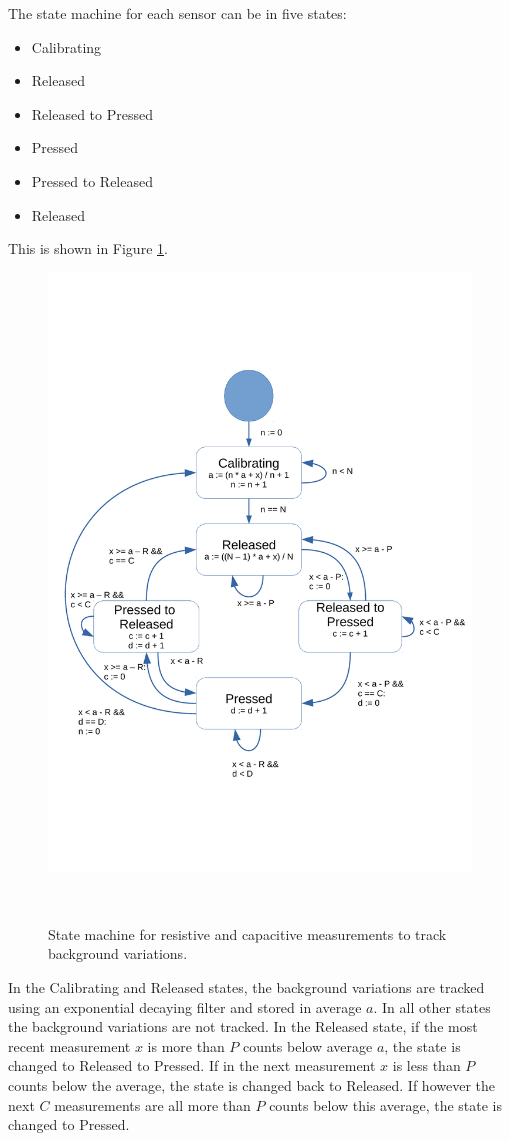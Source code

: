 \documentclass{sigchi-ext}
\begin{document}
The state machine for each sensor can be in five states:
\begin{itemize}
\item Calibrating
\item Released
\item Released to Pressed
\item Pressed
\item Pressed to Released
\item Released
\end{itemize}
This is shown in Figure \ref{fig:state_machine}.

\begin{figure}[!htbp]
\centering
  \includegraphics[width=0.9\columnwidth]{figures/state_machine}
  \caption{State machine for resistive and capacitive measurements to track
background variations.}~\label{fig:state_machine}
\end{figure}

In the Calibrating and Released states, the background variations are tracked
using an exponential decaying filter and stored in average $a$. In all other
states the background variations are not tracked. In the Released state, if the
most recent measurement $x$ is more than $P$ counts below average $a$, the state
is changed to Released to Pressed. If in the next measurement $x$ is less
than $P$ counts below the average, the state is changed back to Released. If
however the next $C$ measurements are all more than $P$ counts below this
average, the state is changed to Pressed.
\end{document}
